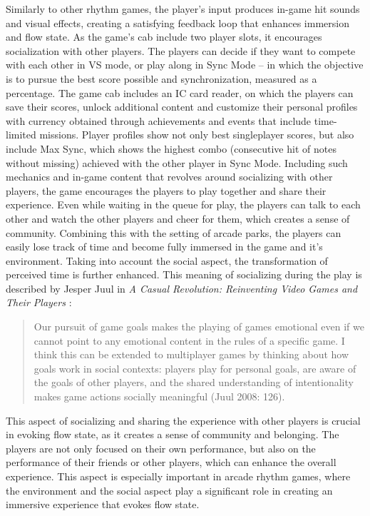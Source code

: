 Similarly to other rhythm games, the player’s input produces in-game hit sounds and visual effects, creating a satisfying feedback loop that enhances immersion and flow state. As the game’s cab include two player slots, it encourages socialization with other players. The players can decide if they want to compete with each other in VS mode, or play along in Sync Mode -- in which the objective is to pursue the best score possible and synchronization, measured as a percentage. The game cab includes an IC card reader, on which the players can save their scores, unlock additional content and customize their personal profiles with currency obtained through achievements and events that include time-limited missions. Player profiles show not only best singleplayer scores, but also include Max Sync, which shows the highest combo (consecutive hit of notes without missing) achieved with the other player in Sync Mode. Including such mechanics and in-game content that revolves around socializing with other players, the game encourages the players to play together and share their experience. Even while waiting in the queue for play, the players can talk to each other and watch the other players and cheer for them, which creates a sense of community. Combining this with the setting of arcade parks, the players can easily lose track of time and become fully immersed in the game and it’s environment. Taking into account the social aspect, the transformation of perceived time is further enhanced. This meaning of socializing during the play is described by Jesper Juul in \textit{A Casual Revolution: Reinventing Video Games and Their Players} \cite{casualrevolution}:

\begin{quote}
    Our pursuit of game goals makes the playing of games emotional even if we cannot point to any emotional content in the rules of a specific game. I think this can be
    extended to multiplayer games by thinking about how goals work in social contexts: players play for personal goals, are aware of the goals of other players, and the shared understanding of intentionality makes game actions socially meaningful (Juul 2008: 126).
\end{quote}

This aspect of socializing and sharing the experience with other players is crucial in evoking flow state, as it creates a sense of community and belonging. The players are not only focused on their own performance, but also on the performance of their friends or other players, which can enhance the overall experience. This aspect is especially important in arcade rhythm games, where the environment and the social aspect play a significant role in creating an immersive experience that evokes flow state.
